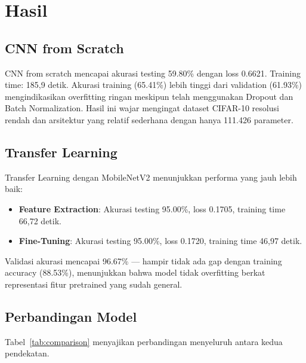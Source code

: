 \documentclass[conference]{IEEEtran}
\begin{document}
\section{Hasil}
\subsection{CNN from Scratch}
CNN from scratch mencapai akurasi testing 59.80\% dengan loss 0.6621. Training time: 185,9 detik. Akurasi training (65.41\%) lebih tinggi dari validation (61.93\%) mengindikasikan overfitting ringan meskipun telah menggunakan Dropout dan Batch Normalization. Hasil ini wajar mengingat dataset CIFAR-10 resolusi rendah dan arsitektur yang relatif sederhana dengan hanya 111.426 parameter.

\subsection{Transfer Learning}
Transfer Learning dengan MobileNetV2 menunjukkan performa yang jauh lebih baik:
\begin{itemize}
\item \textbf{Feature Extraction}: Akurasi testing 95.00\%, loss 0.1705, training time 66,72 detik.
\item \textbf{Fine-Tuning}: Akurasi testing 95.00\%, loss 0.1720, training time 46,97 detik.
\end{itemize}
Validasi akurasi mencapai 96.67\% — hampir tidak ada gap dengan training accuracy (88.53\%), menunjukkan bahwa model tidak overfitting berkat representasi fitur pretrained yang sudah general.

\subsection{Perbandingan Model}
Tabel~\ref{tab:comparison} menyajikan perbandingan menyeluruh antara kedua pendekatan.
\end{document}
